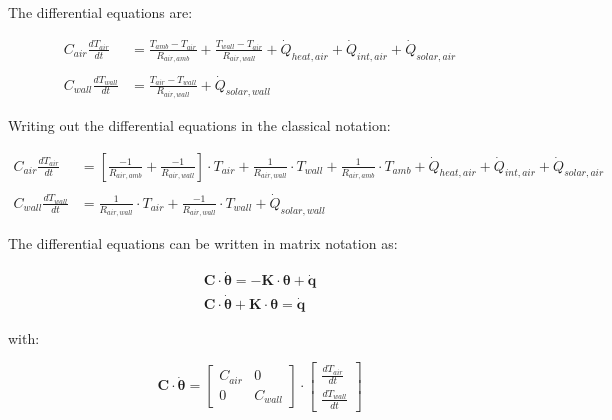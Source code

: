 The differential equations are:

\begin{equation}
	\begin{aligned}
	C_{air}\frac{dT_{air}}{dt} &=\frac{T_{amb}-T_{air}}{R_{air, amb}} + \frac{T_{wall}-T_{air}}{R_{air, wall}} + \dot{Q}_{heat, air} + \dot{Q}_{int, air} + \dot{Q}_{solar, air} 
	\\ \\
	C_{wall}\frac{dT_{wall}}{dt} &=\frac{T_{air}-T_{wall}}{R_{air, wall}} + \dot{Q}_{solar, wall}
    \end{aligned}
\end{equation}

Writing out the differential equations in the classical notation:

\begin{equation}
	\begin{aligned}
		C_{air}\frac{dT_{air}}{dt} &= \left[ \frac{-1}{R_{air, amb}} + \frac{-1}{R_{air, wall}} \right]  \cdot T_{air}  + \frac{1}{R_{air, wall}} \cdot T_{wall} + \frac{1}{R_{air, amb}} \cdot T_{amb} + \dot{Q}_{heat, air} + \dot{Q}_{int, air} + \dot{Q}_{solar, air} 
		\\ \\
		C_{wall}\frac{dT_{wall}}{dt} &= \frac{1}{R_{air, wall}} \cdot T_{air} + \frac{-1}{R_{air, wall}}   \cdot T_{wall} + \dot{Q}_{solar, wall}
	\end{aligned}
\end{equation}

The differential equations can be written in matrix notation as:

\begin{subequations}
	\label{eq:matnot}
	\begin{align}
	\mathbf{C} \cdot \boldsymbol{\dot{\theta}} = - \mathbf{K} \cdot \boldsymbol{\theta} + \mathbf{\dot{q}} \\ 
	\mathbf{C} \cdot \boldsymbol{\dot{\theta}} + \mathbf{K} \cdot \boldsymbol{\theta} = \mathbf{\dot{q}}
	\end{align}
\end{subequations}

with:

\begin{equation}
	\mathbf{C} \cdot \boldsymbol{\dot{\theta}} =
	\begin{bmatrix}
		C_{air} & 0 \\
		0 &  C_{wall}
	\end{bmatrix}
    \cdot
    \begin{bmatrix}
    	\frac{dT_{air}}{dt} \\
    	\frac{dT_{wall}}{dt}
    \end{bmatrix}
\end{equation}

